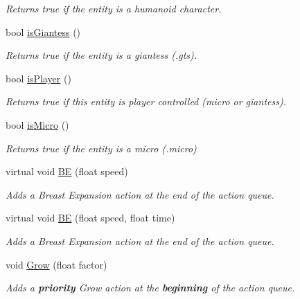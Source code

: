 \begin{DoxyCompactItemize}
\begin{DoxyCompactList}\small\item\em Returns true if the entity is a humanoid character. \end{DoxyCompactList}\item 
bool \mbox{\hyperlink{class_lua_1_1_entity_af72e042e1fd05c66abceebb49ec2caf4}{is\+Giantess}} ()
\begin{DoxyCompactList}\small\item\em Returns true if the entity is a giantess (.gts). \end{DoxyCompactList}\item 
bool \mbox{\hyperlink{class_lua_1_1_entity_af7b9099c16b719f42e4fdfd82661d259}{is\+Player}} ()
\begin{DoxyCompactList}\small\item\em Returns true if this entity is player controlled (micro or giantess). \end{DoxyCompactList}\item 
bool \mbox{\hyperlink{class_lua_1_1_entity_a5eaa128b6b8cf4aeb7f219edd030d61e}{is\+Micro}} ()
\begin{DoxyCompactList}\small\item\em Returns true if the entity is a micro (.micro) \end{DoxyCompactList}\item 
virtual void \mbox{\hyperlink{class_lua_1_1_entity_a1bf50f8db78480e10f40a71e44480e21}{BE}} (float speed)
\begin{DoxyCompactList}\small\item\em Adds a Breast Expansion action at the end of the action queue. \end{DoxyCompactList}\item 
virtual void \mbox{\hyperlink{class_lua_1_1_entity_ac8dfc303d378e4e805c5ba3f38f49c59}{BE}} (float speed, float time)
\begin{DoxyCompactList}\small\item\em Adds a Breast Expansion action at the end of the action queue. \end{DoxyCompactList}\item 
void \mbox{\hyperlink{class_lua_1_1_entity_a92feb21c4219c60a7e5935733302083f}{Grow}} (float factor)
\begin{DoxyCompactList}\small\item\em Adds a {\bfseries{priority}} Grow action at the {\bfseries{beginning}} of the action queue. \end{DoxyCompactList}\item 

\end{DoxyCompactItemize}
